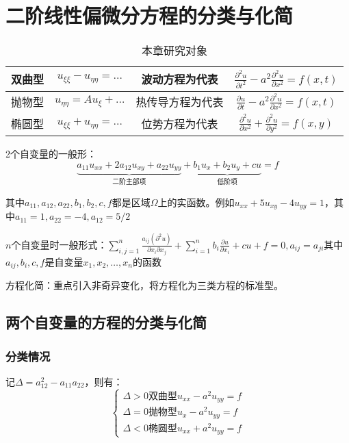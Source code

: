\chapter{二阶线性偏微分方程的分类与化简}

\begin{table}[htbp]
	\centering
	\caption{本章研究对象}
	\begin{tabular}{|c|c|c|c|}
		\hline
		双曲型 & \(u_{\xi\xi}-u_{\eta\eta}=\ldots\) & 波动方程为代表 & \(\frac{\partial^2u}{\partial t^2}-a^2\frac{\partial^2u}{\partial x^2}=f(x,t)\) \\
		\hline
		抛物型 & \(u_{\eta\eta}=Au_\xi+\ldots\) & 热传导方程为代表 & \(\frac{\partial u}{\partial t}-a^2\frac{\partial^2u}{\partial x^2}=f(x,t)\) \\
		\hline
		椭圆型 & \(u_{\xi\xi}+u_{\eta\eta}=\ldots\) & 位势方程为代表 & \(\frac{\partial^2u}{\partial x^2}+\frac{\partial^2u}{\partial y^2}=f(x,y)\) \\
		\hline
	\end{tabular}
\end{table}

2个自变量的一般形：
\[
\underbrace{a_{11}u_{xx}+2a_{12}u_{xy}+a_{22}u_{yy}}_{\text{二阶主部项}}+\underbrace{b_1u_x+b_2u_y+cu}_{\text{低阶项}}=f
\]

其中\(a_{11},a_{12},a_{22},b_1,b_2,c,f\)都是区域\(\Omega\)上的实函数。例如\(u_{xx}+5u_{xy}-4u_{yy}=1\)，其中\(a_{11}=1,a_{22}=-4,a_{12}=5/2\)

\(n\)个自变量时一般形式：\(\sum\limits_{i,j=1}^{n}\frac{a_{ij}\left(\partial^2u\right)}{\partial x_i\partial x_j}+\sum\limits_{i=1}^{n}{b_i\frac{\partial u}{\partial x_i}}+cu+f=0,a_{ij}=a_{ji}\)其中\(a_{ij},b_i,c,f\)是自变量\(x_1,x_2,\ldots,x_n\)的函数

方程化简：重点引入非奇异变化，将方程化为三类方程的标准型。

\section{两个自变量的方程的分类与化简}

\subsection{分类情况}

记\(\Delta=a_{12}^2-a_{11}a_{22}\)，则有：
\[\begin{cases}
\Delta>0\text{双曲型}u_{xx}-a^2u_{yy}=f\\
\Delta=0\text{抛物型}u_{x}-a^2u_{yy}=f\\
\Delta<0\text{椭圆型}u_{xx}+a^2u_{yy}=f
\end{cases}\]

